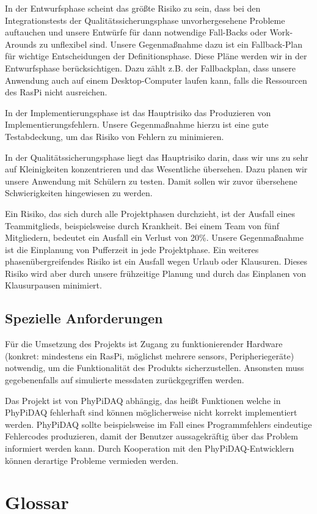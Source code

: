 \documentclass[parskip=full]{scrartcl}
\begin{document}
In der Entwurfsphase scheint das größte Risiko zu sein, dass bei den Integrationstests der Qualitätssicherungsphase unvorhergesehene Probleme auftauchen und unsere Entwürfe für dann notwendige Fall-Backs oder Work-Arounds zu unflexibel sind. Unsere Gegenmaßnahme dazu ist ein Fallback-Plan für wichtige Entscheidungen der Definitionsphase. Diese Pläne werden wir in der Entwurfsphase berücksichtigen. Dazu zählt z.B. der Fallbackplan, dass unsere Anwendung auch auf einem Desktop-Computer laufen kann, falls die Ressourcen des \gls{RasPi} nicht ausreichen.
 
In der Implementierungsphase ist das Hauptrisiko das Produzieren von Implementierungsfehlern. Unsere Gegenmaßnahme hierzu ist eine gute Testabdeckung, um das Risiko von Fehlern zu minimieren.
 
In der Qualitätssicherungsphase liegt das Hauptrisiko darin, dass wir uns zu sehr auf Kleinigkeiten konzentrieren und das Wesentliche 
übersehen. Dazu planen wir unsere Anwendung mit Schülern zu testen. Damit sollen wir zuvor übersehene Schwierigkeiten hingewiesen zu werden.

Ein Risiko, das sich durch alle Projektphasen durchzieht, ist der Ausfall eines Teammitglieds, beispielsweise durch Krankheit. Bei einem Team von fünf Mitgliedern, bedeutet ein Ausfall ein Verlust von 20\%. Unsere Gegenmaßnahme ist die Einplanung von Pufferzeit in jede Projektphase. Ein weiteres phasenübergreifendes Risiko ist ein Ausfall wegen Urlaub oder Klausuren. Dieses Risiko wird aber durch unsere frühzeitige Planung und durch das Einplanen von Klausurpausen minimiert.

\subsection{Spezielle Anforderungen}\label{entwicklungsumgebung}

Für die Umsetzung des Projekts ist Zugang zu funktionierender Hardware (konkret: mindestens ein \gls{RasPi}, möglichst mehrere \glspl{sensor}, Peripheriegeräte) notwendig, um die Funktionalität des Produkts sicherzustellen.\newline
Ansonsten muss gegebenenfalls auf simulierte \gls{messdaten} zurückgegriffen werden.

Das Projekt ist von \gls{PhyPiDAQ} abhängig, das heißt Funktionen welche in PhyPiDAQ fehlerhaft sind können möglicherweise nicht korrekt implementiert werden. PhyPiDAQ sollte beispielsweise im Fall eines Programmfehlers eindeutige Fehlercodes produzieren, damit der Benutzer aussagekräftig über das Problem informiert werden kann.\newline
Durch Kooperation mit den PhyPiDAQ-Entwicklern können derartige Probleme vermieden werden.

\clearpage
\section{Glossar}\label{glossar}

\renewcommand*{\glossarysection}[2][]{}	%
\printnoidxglossaries				%
\end{document}

